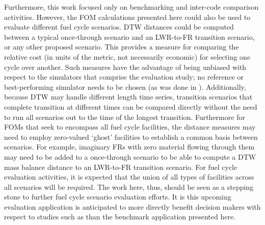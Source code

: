 Furthermore, this work focused only on benchmarking and inter-code comparison
activities.
However, the FOM calculations presented here could also be used to evaluate 
different fuel cycle scenarios. DTW distances could be computed between
a typical once-through scenario and an LWR-to-FR transition
scenario, or any other proposed scenario. This provides a measure for 
comparing the relative cost (in units of the metric, not necessarily 
economic) for selecting one cycle over another. 
Such measures have the advantage of being unbiased with respect to the 
simulators that comprise the evaluation study; no reference or best-performing
simulator needs to be chosen (as was done in \cite{wigeland2014nuclear}). 
Additionally, because DTW may handle different length time series, 
transition scenarios that complete transition at different times can be 
compared directly without the need to run all scenarios out to the time of 
the longest transition.
Furthermore for FOMs that seek to encompass all fuel cycle facilities,
the distance measures may need to employ zero-valued `ghost' 
facilities to establish a common basis between scenarios.  For example, 
imaginary FRs with zero material flowing through them may need to be added 
to a once-through scenario to be able to compute a DTW mass balance distance 
to an LWR-to-FR transition scenario. For fuel cycle evaluation activities,
it is expected that the union of all types of facilities across all scenarios 
will be required.
The work here, thus, 
should be seen as a stepping stone to further fuel cycle scenario evaluation
efforts. It is this upcoming evaluation application is anticipated to more 
directly benefit decision makers with respect to studies such as 
\cite{wigeland2014nuclear} than the benchmark application presented here.
